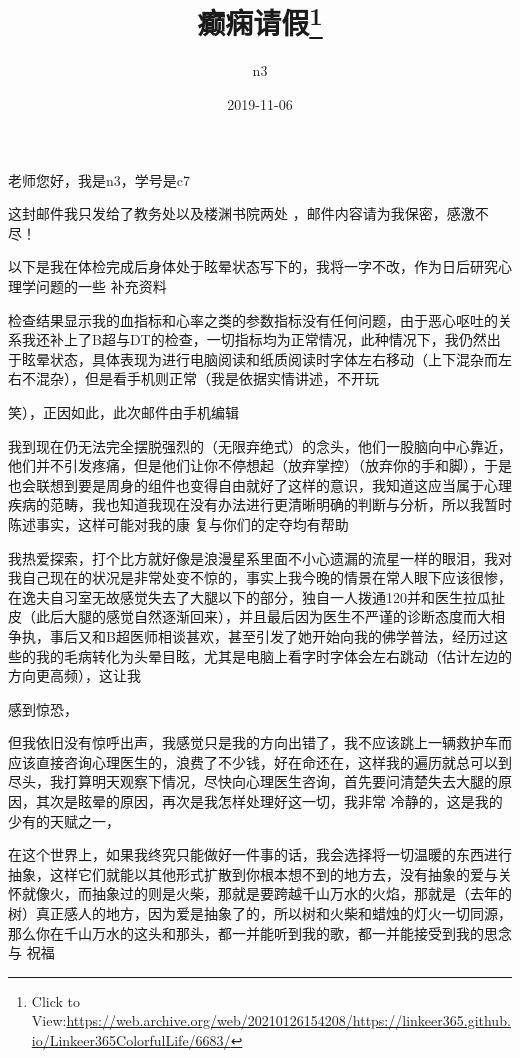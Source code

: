 \documentclass{article}
\title{癫痫请假\footnote{Click to View:\url{https://web.archive.org/web/20210126154208/https://linkeer365.github.io/Linkeer365ColorfulLife/6683/}}}
\author{n3}
\date{2019-11-06}
\begin{document}

\maketitle


\Large


﻿老师您好，我是n3，学号是c7 

这封邮件我只发给了教务处以及楼渊书院两处
，邮件内容请为我保密，感激不尽！ 

以下是我在体检完成后身体处于眩晕状态写下的，我将一字不改，作为日后研究心理学问题的一些
补充资料 

检查结果显示我的血指标和心率之类的参数指标没有任何问题，由于恶心呕吐的关系我还补上了B超与DT的检查，一切指标均为正常情况，此种情况下，我仍然出于眩晕状态，具体表现为进行电脑阅读和纸质阅读时字体左右移动（上下混杂而左右不混杂），但是看手机则正常（我是依据实情讲述，不开玩
\newpage

笑），正因如此，此次邮件由手机编辑 

我到现在仍无法完全摆脱强烈的（无限弃绝式）的念头，他们一股脑向中心靠近，他们并不引发疼痛，但是他们让你不停想起（放弃掌控）（放弃你的手和脚），于是也会联想到要是周身的组件也变得自由就好了这样的意识，我知道这应当属于心理疾病的范畴，我也知道我现在没有办法进行更清晰明确的判断与分析，所以我暂时陈述事实，这样可能对我的康
复与你们的定夺均有帮助 

我热爱探索，打个比方就好像是浪漫星系里面不小心遗漏的流星一样的眼泪，我对我自己现在的状况是非常处变不惊的，事实上我今晚的情景在常人眼下应该很惨，在逸夫自习室无故感觉失去了大腿以下的部分，独自一人拨通120并和医生拉瓜扯皮（此后大腿的感觉自然逐渐回来），并且最后因为医生不严谨的诊断态度而大相争执，事后又和B超医师相谈甚欢，甚至引发了她开始向我的佛学普法，经历过这些的我的毛病转化为头晕目眩，尤其是电脑上看字时字体会左右跳动（估计左边的方向更高频），这让我
\newpage

感到惊恐， 

但我依旧没有惊呼出声，我感觉只是我的方向出错了，我不应该跳上一辆救护车而应该直接咨询心理医生的，浪费了不少钱，好在命还在，这样我的遍历就总可以到尽头，我打算明天观察下情况，尽快向心理医生咨询，首先要问清楚失去大腿的原因，其次是眩晕的原因，再次是我怎样处理好这一切，我非常
冷静的，这是我的少有的天赋之一， 

在这个世界上，如果我终究只能做好一件事的话，我会选择将一切温暖的东西进行抽象，这样它们就能以其他形式扩散到你根本想不到的地方去，没有抽象的爱与关怀就像火，而抽象过的则是火柴，那就是要跨越千山万水的火焰，那就是（去年的树）真正感人的地方，因为爱是抽象了的，所以树和火柴和蜡烛的灯火一切同源，那么你在千山万水的这头和那头，都一并能听到我的歌，都一并能接受到我的思念与
祝福 
\end{document}
